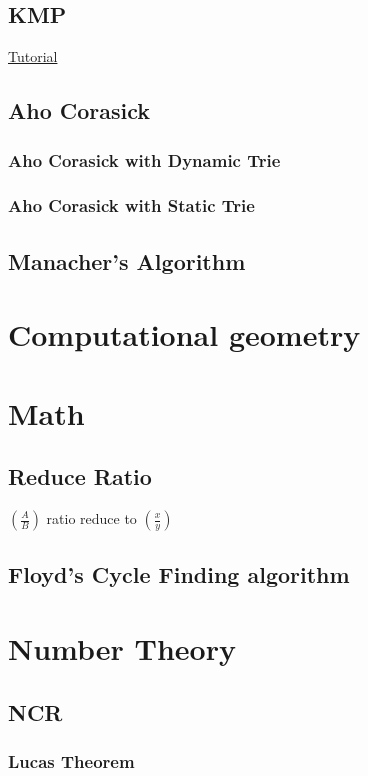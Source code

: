 \documentclass[1pt]{report}
\begin{document}
\section{KMP}
\href{https://tanvir002700.wordpress.com/2015/03/03/kmp-knuth-morris-pratt-algorithm/}{Tutorial}

\section{Aho Corasick}
\subsection{Aho Corasick with Dynamic Trie}

\subsection{Aho Corasick with Static Trie}

\section{Manacher's Algorithm}




\chapter{Computational geometry}


\chapter{Math}
\section{Reduce Ratio}
$\left(\frac{A}{B}\right)$ ratio reduce to $\left(\frac{x}{y}\right)$

\section{Floyd's Cycle Finding algorithm}



\chapter{Number Theory}
\section{NCR}
\subsection{Lucas Theorem}


\end{document}
